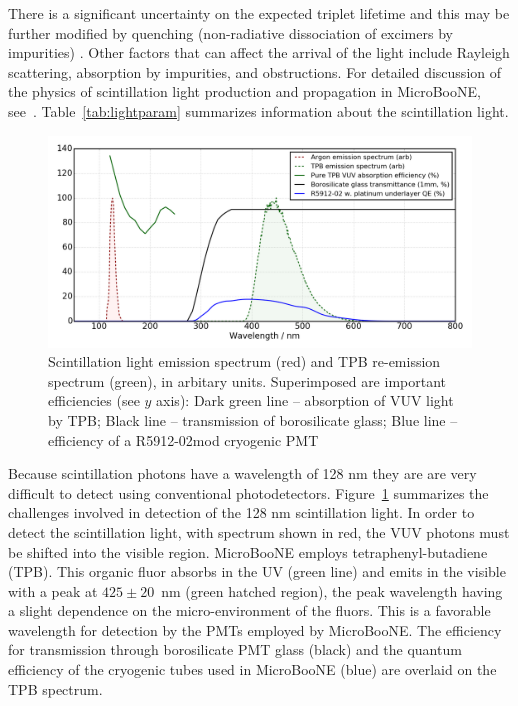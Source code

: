 There is a significant uncertainty on the expected triplet lifetime \cite{PhysRevB.27.5279} and this may be further modified by quenching (non-radiative dissociation of excimers by impurities)  \cite{Acciarri:2008kv}.  Other factors that can affect the arrival of the light include Rayleigh scattering, absorption by impurities, and obstructions.  For detailed discussion of the physics of scintillation light production and propagation in MicroBooNE, see~\cite{Jones:2015bya}. Table~\ref{tab:lightparam} summarizes information about the scintillation light.  

\begin{figure}[t]
	\centering
\includegraphics[width=\textwidth]{./light_figures/pmttpbeff.png} 
        \caption{Scintillation light emission spectrum (red) and TPB re-emission spectrum (green), in arbitary units.  Superimposed are important efficiencies (see $y$ axis):  Dark green line -- absorption of VUV light by TPB;  Black line -- transmission of borosilicate glass;  Blue line -- efficiency of a R5912-02mod cryogenic PMT \cite{Jones:2015bya} }\label{fig:lightchallenge}
\end{figure}


Because scintillation photons have a wavelength of 128 nm they are are very difficult to detect using conventional photodetectors.  Figure~\ref{fig:lightchallenge} summarizes the challenges involved in detection of the 128 nm scintillation light.  
In order to detect the scintillation light, with spectrum shown in red, the VUV photons must be shifted into the visible region.   MicroBooNE employs tetraphenyl-butadiene (TPB).
This organic fluor absorbs in the UV (green line) and emits in the visible with a peak at $425\pm20$~nm (green hatched region), the peak wavelength having a slight dependence on the micro-environment of the fluors.  This is a favorable wavelength for detection by the PMTs employed by MicroBooNE.  The efficiency for transmission through borosilicate PMT glass (black) and the quantum efficiency of the cryogenic tubes used in MicroBooNE (blue) are overlaid on the TPB spectrum.

